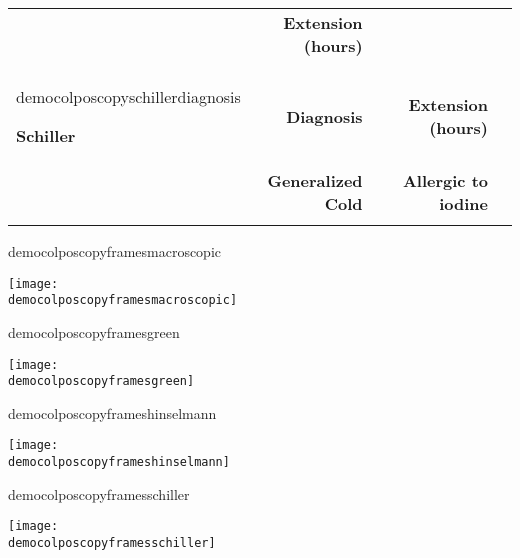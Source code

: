 \documentclass[6pt,letterpaper,spanish]{article}
\newcommand{\checkfor}[2]{%
  \ifcsname#1\endcsname%
    #2
  \else%
  \fi%
}
\begin{document}
{\begin{minipage}{\textwidth}
\begin{tabular}{p{}|rlrl}
{{			& \textbf{Extension (hours)} & \democolposcopyhinselmannangle\\
		}
	}
	\\
	\checkfor{democolposcopyschillerdiagnosis}{
	\textbf{Schiller}
	& \textbf{Diagnosis} & \democolposcopyschillerdiagnosis
    & \textbf{Extension (hours)} & \democolposcopyschillerangle\\
	& \textbf{Generalized Cold} & \democolposcopyschillercold
	& \textbf{Allergic to iodine} & \democolposcopyschillerallergic\\
	}
\end{tabular}%
\begin{center}
\checkfor{democolposcopyframesmacroscopic}
{
	\begin{minipage}{0.2\textwidth}
	\centering
	\texttt{[image: \\democolposcopyframesmacroscopic]}
	\end{minipage}	
}%
\checkfor{democolposcopyframesgreen}
{
	\begin{minipage}{0.2\textwidth}
	\centering
	\texttt{[image: \\democolposcopyframesgreen]}
	\end{minipage}	
}%
\checkfor{democolposcopyframeshinselmann}
{
	\begin{minipage}{0.2\textwidth}
	\centering
	\texttt{[image: \\democolposcopyframeshinselmann]}
	\end{minipage}
}%
\checkfor{democolposcopyframesschiller}
{
	\begin{minipage}{0.2\textwidth}
	\centering
	\texttt{[image: \\democolposcopyframesschiller]}
	\end{minipage}
	
}
\end{center}
\end{minipage}
}
\end{document}
